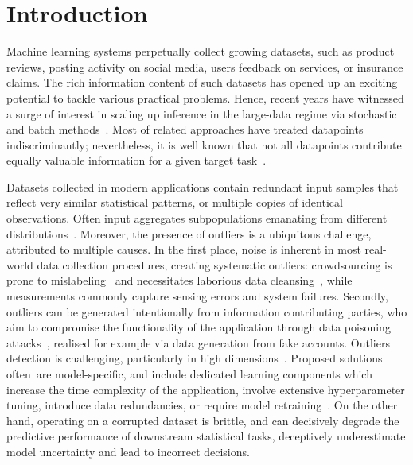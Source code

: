 \section{Introduction}
\label{sec:introduction}

Machine learning systems perpetually collect growing datasets, such as product reviews, posting activity on social media, users feedback on services, or insurance claims. The rich information content of such datasets has opened up an exciting potential to tackle various practical problems. Hence, recent years have witnessed a surge of interest in scaling up inference in the large-data regime via stochastic and batch methods~\cite{angelino16, hoffman13, welling11}. Most of related approaches have treated datapoints indiscriminantly; nevertheless, it is well known that not all datapoints contribute equally valuable information for a given target task~\cite{ghorbani19}. 

Datasets collected in modern applications contain redundant input samples that reflect very similar statistical patterns, or multiple copies of identical observations. Often input aggregates subpopulations emanating from different distributions~\cite{zheng08, zhuang15}. Moreover, the presence of outliers is a ubiquitous challenge, attributed to multiple causes. In the first place, noise is inherent in most real-world data collection procedures, creating systematic outliers: crowdsourcing is prone to mislabeling~\cite{frenay13} and necessitates laborious data cleansing~\cite{lewis04, paschou10}, while measurements commonly capture sensing errors and system failures. Secondly, outliers can be generated intentionally from information contributing parties, who aim to compromise the functionality of the application through data poisoning attacks~\cite{barreno10, biggio12, li16, koh17, steinhardt17, ghorbani19}, realised for example via data generation from fake accounts. Outliers detection is  challenging, particularly in high dimensions~\cite{diakonikolas19, dickens20}. Proposed solutions \mbox{often are} model-specific, and include dedicated learning components which increase the time complexity of the application, involve extensive hyperparameter tuning, introduce data redundancies, or require model retraining~\cite{sheng08, whitehill09, raykar10, karger11, liu12, zhang16}. On the other hand, operating on a corrupted dataset is brittle, and can decisively degrade the predictive performance of downstream statistical tasks, deceptively underestimate model uncertainty and lead to incorrect decisions. 

